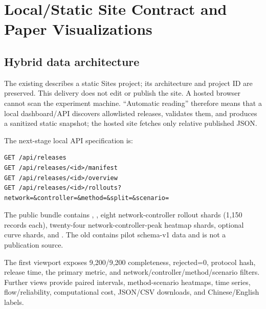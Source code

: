 \chapter{Local/Static Site Contract and Paper Visualizations}

\section{Hybrid data architecture}
The existing  describes a static Sites project; its architecture and project ID are preserved. This delivery does not edit or publish the site. A hosted browser cannot scan the experiment machine. “Automatic reading” therefore means that a local dashboard/API discovers allowlisted releases, validates them, and produces a sanitized static snapshot; the hosted site fetches only relative published JSON.

The next-stage local API specification is:
\begin{Verbatim}[fontsize=\small,breaklines=true]
GET /api/releases
GET /api/releases/<id>/manifest
GET /api/releases/<id>/overview
GET /api/releases/<id>/rollouts?network=&controller=&method=&split=&scenario=
\end{Verbatim}

The public bundle contains , , eight network-controller rollout shards (1,150 records each), twenty-four network-controller-peak heatmap shards, optional curve shards, and . The old  contains pilot schema-v1 data and is not a publication source.

The first viewport exposes 9,200/9,200 completeness, rejected=0, protocol hash, release time, the primary metric, and network/controller/method/scenario filters. Further views provide paired intervals, method-scenario heatmaps, time series, flow/reliability, computational cost, JSON/CSV downloads, and Chinese/English labels.

